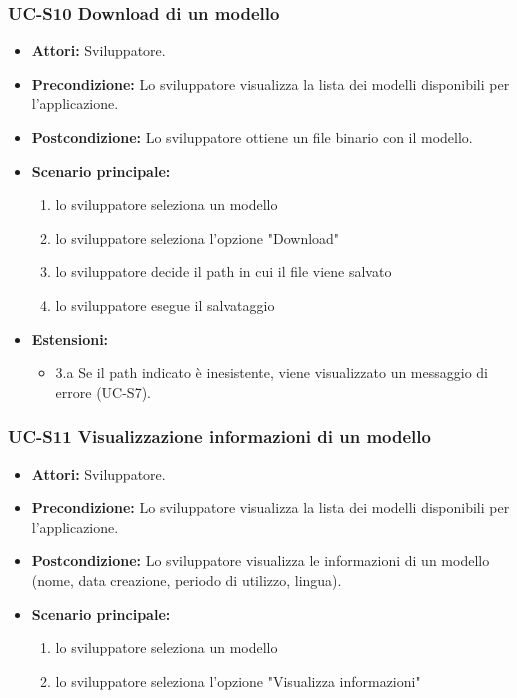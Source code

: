 	\subsubsection{UC-S10 Download di un modello}
		\begin{itemize}
			\item \textbf{Attori:} Sviluppatore.
			\item \textbf{Precondizione:} Lo sviluppatore visualizza la lista dei modelli disponibili per l'applicazione.
			\item \textbf{Postcondizione:} Lo sviluppatore ottiene un file binario con il modello.
			\item \textbf{Scenario principale:}
			\begin{enumerate}
				\item lo sviluppatore seleziona un modello
				\item lo sviluppatore seleziona l'opzione "Download"
				\item lo sviluppatore decide il path in cui il file viene salvato
				\item lo sviluppatore esegue il salvataggio
			\end{enumerate}
			\item \textbf{Estensioni:}
				\begin{itemize}
					\item 3.a Se il path indicato è inesistente, viene visualizzato un messaggio di errore (UC-S7).
				\end{itemize}
		\end{itemize}	

	\subsubsection{UC-S11 Visualizzazione informazioni di un modello}
		\begin{itemize}
			\item \textbf{Attori:} Sviluppatore.
			\item \textbf{Precondizione:} Lo sviluppatore visualizza la lista dei modelli disponibili per l'applicazione.
			\item \textbf{Postcondizione:} Lo sviluppatore visualizza le informazioni di un modello (nome, data creazione, periodo di utilizzo, lingua).
			\item \textbf{Scenario principale:}
			\begin{enumerate}
				\item lo sviluppatore seleziona un modello
				\item lo sviluppatore seleziona l'opzione "Visualizza informazioni"
				\end{enumerate}
		\end{itemize}
		
